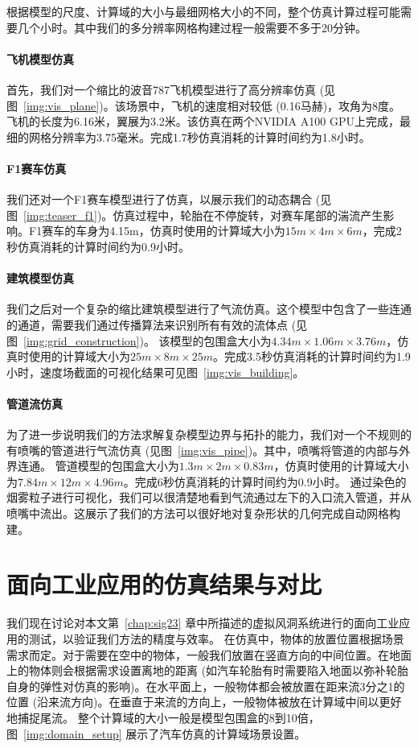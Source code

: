 根据模型的尺度、计算域的大小与最细网格大小的不同，整个仿真计算过程可能需要几个小时。其中我们的多分辨率网格构建过程一般需要不多于20分钟。

\paragraph{飞机模型仿真}
首先，我们对一个缩比的波音787飞机模型进行了高分辨率仿真 (见图~\ref{img:vis_plane})。该场景中，飞机的速度相对较低 (0.16马赫)，攻角为8度。飞机的长度为6.16米，翼展为3.2米。该仿真在两个NVIDIA A100 GPU上完成，最细的网格分辨率为3.75毫米。完成1.7秒仿真消耗的计算时间约为1.8小时。

\paragraph{F1赛车仿真}
我们还对一个F1赛车模型进行了仿真，以展示我们的动态耦合 (见图~\ref{img:teaser_f1})。仿真过程中，轮胎在不停旋转，对赛车尾部的湍流产生影响。F1赛车的车身为4.15m，仿真时使用的计算域大小为$15m\!\times\!4m\!\times\!6m$，完成2秒仿真消耗的计算时间约为0.9小时。

\paragraph{建筑模型仿真}
我们之后对一个复杂的缩比建筑模型进行了气流仿真。这个模型中包含了一些连通的通道，需要我们通过传播算法来识别所有有效的流体点 (见图~\ref{img:grid_construction})。
该模型的包围盒大小为$4.34m\!\times\!1.06m\!\times\!3.76m$，仿真时使用的计算域大小为$25m\!\times\!8m\!\times\!25m$。完成3.5秒仿真消耗的计算时间约为1.9小时，速度场截面的可视化结果可见图~\ref{img:vis_building}。

\paragraph{管道流仿真}
为了进一步说明我们的方法求解复杂模型边界与拓扑的能力，我们对一个不规则的有喷嘴的管道进行气流仿真 (见图~\ref{img:vis_pipe})。其中，喷嘴将管道的内部与外界连通。
管道模型的包围盒大小为$1.3m\!\times\!2m\!\times\!0.83m$，仿真时使用的计算域大小为$7.84m\!\times\!12m\!\times\!4.96m$。完成6秒仿真消耗的计算时间约为0.9小时。
通过染色的烟雾粒子进行可视化，我们可以很清楚地看到气流通过左下的入口流入管道，并从喷嘴中流出。这展示了我们的方法可以很好地对复杂形状的几何完成自动网格构建。

\section{面向工业应用的仿真结果与对比}
我们现在讨论对本文第~\ref{chap:sig23} 章中所描述的虚拟风洞系统进行的面向工业应用的测试，以验证我们方法的精度与效率。
在仿真中，物体的放置位置根据场景需求而定。对于需要在空中的物体，一般我们放置在竖直方向的中间位置。在地面上的物体则会根据需求设置离地的距离 (如汽车轮胎有时需要陷入地面以弥补轮胎自身的弹性对仿真的影响)。在水平面上，一般物体都会被放置在距来流3分之1的位置 (沿来流方向)。在垂直于来流的方向上，一般物体被放在计算域中间以更好地捕捉尾流。
整个计算域的大小一般是模型包围盒的8到10倍，图~\ref{img:domain_setup} 展示了汽车仿真的计算域场景设置。

